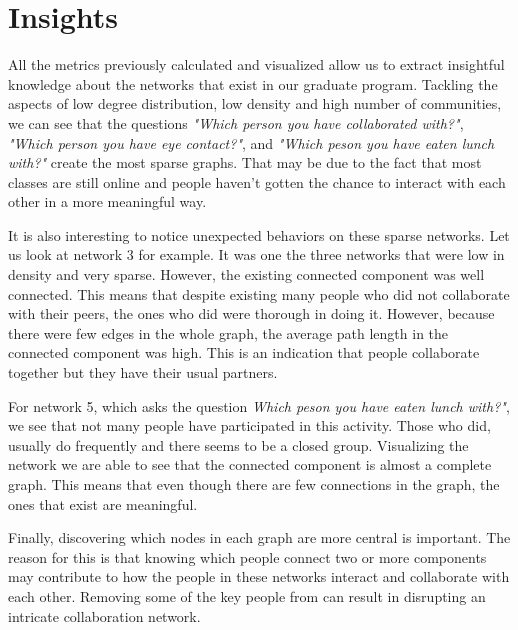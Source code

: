 \section{Insights}
All the metrics previously calculated and visualized allow us to extract insightful knowledge about the networks that exist in our graduate program. Tackling the aspects of low degree distribution, low density and high number of communities, we can see that the questions \textit{"Which person you have collaborated with?"}, \textit{"Which person you have eye contact?"}, and \textit{"Which peson you have eaten lunch with?"} create the most sparse graphs. That may be due to the fact that most classes are still online and people haven't gotten the chance to interact with each other in a more meaningful way.

It is also interesting to notice unexpected behaviors on these sparse networks. Let us look at network 3 for example. It was one the three networks that were low in density and very sparse. However, the existing connected component was well connected. This means that despite existing many people who did not collaborate with their peers, the ones who did were thorough in doing it. However, because there were few edges in the whole graph, the average path length in the connected component was high. This is an indication that people collaborate together but they have their usual partners.

For network 5, which asks the question \textit{Which peson you have eaten lunch with?"}, we see that not many people have participated in this activity. Those who did, usually do frequently and there seems to be a closed group. Visualizing the network we are able to see that the connected component is almost a complete graph. This means that even though there are few connections in the graph, the ones that exist are meaningful.

Finally, discovering which nodes in each graph are more central is important. The reason for this is that knowing which people connect two or more components may contribute to how the people in these networks interact and collaborate with each other. Removing some of the key people from can result in disrupting an intricate collaboration network.